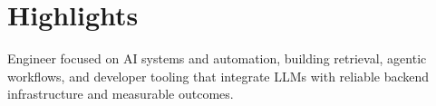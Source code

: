 \section{Highlights}

\begin{onecolentry}
    \begin{highlightsforbulletentries}

    \item Engineer focused on AI systems and automation, building retrieval, agentic workflows, and developer tooling that integrate LLMs with reliable backend infrastructure and measurable outcomes.

    \end{highlightsforbulletentries}
\end{onecolentry}